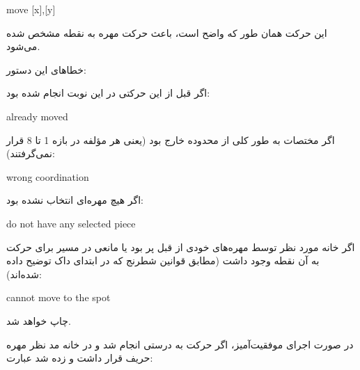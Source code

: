 \documentclass[]{article}
\begin{document}
\hrulefill



\begin{tcolorbox}[boxrule=0pt]
	\begin{latin}
  	  \large{
  	  	move [x],[y]
		}
	\end{latin}
\end{tcolorbox}

این حرکت همان طور که واضح است، باعث حرکت مهره به نقطه مشخص شده می‌شود.

خطاهای این دستور:

اگر قبل از این حرکتی در این نوبت انجام شده بود:


\begin{tcolorbox}[boxrule=0pt]
	\begin{latin}
  	  \large{
  	  	already moved
		}
	\end{latin}
\end{tcolorbox}

 اگر مختصات به طور کلی از محدوده خارج بود (یعنی هر مؤلفه در بازه 1 تا 8 قرار نمی‌گرفتند):



\begin{tcolorbox}[boxrule=0pt]
	\begin{latin}
  	  \large{
  	  	wrong coordination
		}
	\end{latin}
\end{tcolorbox}

اگر هیچ مهره‌ای انتخاب نشده بود:



\begin{tcolorbox}[boxrule=0pt]
	\begin{latin}
  	  \large{
  	  	do not have any selected piece
		}
	\end{latin}
\end{tcolorbox}

اگر خانه مورد نظر توسط مهره‌های خودی از قبل پر بود یا مانعی در مسیر برای حرکت به آن نقطه وجود داشت (مطابق قوانین شطرنج که در ابتدای داک توضیح داده شده‌اند):



\begin{tcolorbox}[boxrule=0pt]
	\begin{latin}
  	  \large{
  	  	cannot move to the spot
		}
	\end{latin}
\end{tcolorbox}

چاپ خواهد شد.

در صورت اجرای موفقیت‌آمیز، اگر حرکت به درستی انجام شد و در خانه مد نظر مهره حریف قرار داشت و زده شد عبارت:
\end{document}
